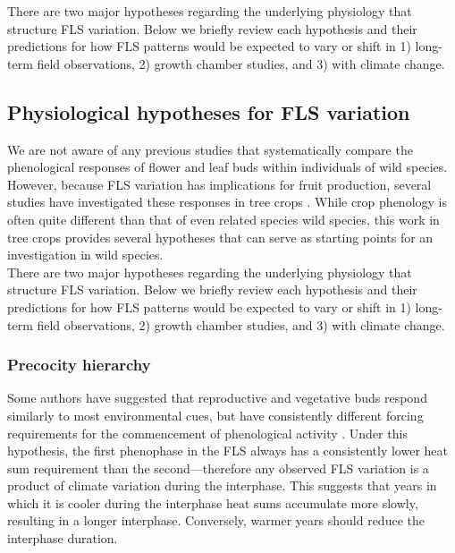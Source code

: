 \documentclass[11pt]{article}
\begin{document}
\noindent There are two major hypotheses regarding the underlying physiology that structure FLS variation. Below we briefly review each hypothesis and their predictions for how FLS patterns would be expected to vary or shift in 1) long-term field observations, 2) growth chamber studies, and 3) with climate change.


\subsection*{Physiological hypotheses for FLS variation}
\noindent We are not aware of any previous studies that systematically compare the phenological responses of flower and leaf buds within individuals of wild species. However, because FLS variation has implications for fruit production, several studies have investigated these responses in tree crops \citep[see][]{Guo_2014,Garigalio2016,Citadin2001}. While crop phenology is often quite different than that of even related species wild species, this work in tree crops provides several hypotheses that can serve as starting points for an investigation in wild species.\\

\noindent There are two major hypotheses regarding the underlying physiology that structure FLS variation. Below we briefly review each hypothesis and their predictions for how FLS patterns would be expected to vary or shift in 1) long-term field observations, 2) growth chamber studies, and 3) with climate change.

\subsubsection*{Precocity hierarchy}%
\noindent Some authors have suggested that reproductive and vegetative buds respond similarly to most environmental cues, but have consistently different forcing requirements for the commencement of phenological activity \citep{Guo_2014}. Under this hypothesis, the first phenophase in the FLS always has a consistently lower heat sum requirement than the second---therefore any observed FLS variation is a product of climate variation during the interphase. This suggests that years in which it is cooler during the interphase heat sums accumulate more slowly, resulting in a longer interphase. Conversely, warmer years should reduce the interphase duration.\\ 
\end{document}
